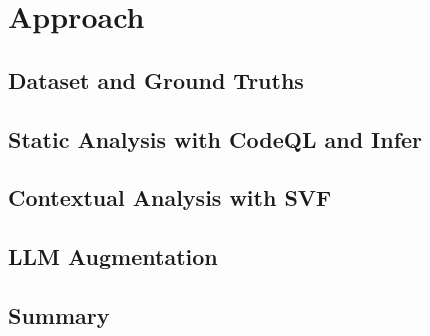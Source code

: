 \newpage
\section{Approach}
\label{sec:approach}


\subsection{Dataset and Ground Truths}
\label{sec:approach:sub:dataset}


\subsection{Static Analysis with CodeQL and Infer}
\label{sec:approach:sub:sast}


\subsection{Contextual Analysis with SVF}
\label{sec:approach:sub:context}


\subsection{LLM Augmentation}
\label{sec:approach:sub:llm}


\subsection{Summary}
\label{sec:approach:sub:summary}
